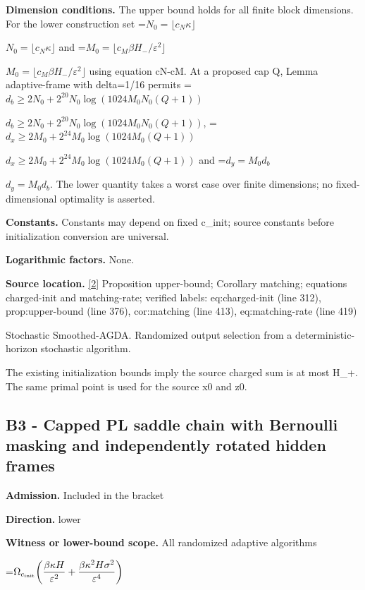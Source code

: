 \documentclass[10pt,a4paper]{article}
\newcommand{\AtlasMath}[1]{\par\begingroup\centering\setbox0=\hbox{$\displaystyle #1$}\ifdim\wd0>1.4\linewidth\typeout{ATLAS WIDE FORMULA: \the\wd0}\fi\ifdim\wd0>\linewidth\resizebox{\linewidth}{!}{\box0}\else\box0\fi\par\endgroup}
\newcommand{\AtlasInlineMath}[1]{\begingroup\setbox0=\hbox{$#1$}\ifdim\wd0>.4\linewidth\endgroup\AtlasMath{#1}\else\endgroup$#1$\fi}
\begin{document}
\textbf{Dimension conditions.} The upper bound holds for all finite block dimensions. For the lower construction set \AtlasInlineMath{N_0=\lfloor c_N\kappa\rfloor} and \AtlasInlineMath{M_0=\lfloor c_M\beta H_-/\varepsilon^2\rfloor} using equation cN-cM. At a proposed cap Q, Lemma adaptive-frame with delta=1/16 permits \AtlasInlineMath{d_b\ge2N_0+2^{20}N_0\log(1024M_0N_0(Q+1))}, \AtlasInlineMath{d_x\ge2M_0+2^{24}M_0\log(1024M_0(Q+1))} and \AtlasInlineMath{d_y=M_0d_b}. The lower quantity takes a worst case over finite dimensions; no fixed-dimensional optimality is asserted.



\textbf{Constants.} Constants may depend on fixed c\_init; source constants before initialization conversion are universal.



\textbf{Logarithmic factors.} None.



\textbf{Source location.} \href{https://github.com/WU-Wendao/Colombo/blob/main/colombo_sensorium/Complexity_altas/data/sources/colombo/N07/manuscript.pdf}{[2]} Proposition upper-bound; Corollary matching; equations charged-init and matching-rate; verified labels: eq:charged-init (line 312), prop:upper-bound (line 376), cor:matching (line 413), eq:matching-rate (line 419)



Stochastic Smoothed-AGDA. Randomized output selection from a deterministic-horizon stochastic algorithm.



The existing initialization bounds imply the source charged sum is at most H\_+. The same primal point is used for the source x0 and z0.



\subsection{B3 - Capped PL saddle chain with Bernoulli masking and independently rotated hidden frames}


\textbf{Admission.} Included in the bracket



\textbf{Direction.} lower



\textbf{Witness or lower-bound scope.} All randomized adaptive algorithms



\AtlasMath{\Omega_{c_{\rm init}}\!\left(\frac{\beta\kappa H}{\varepsilon^2}+\frac{\beta\kappa^2H\sigma^2}{\varepsilon^4}\right)}
\end{document}
